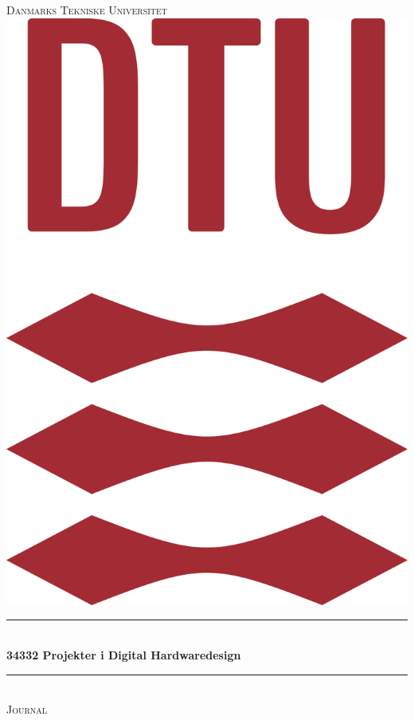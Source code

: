 \begin{titlepage}

\newcommand{\HRule}{\rule{\linewidth}{0.5mm}}

\center

\textsc{\Large Danmarks Tekniske Universitet}\\[1.5cm]

\includegraphics[scale=0.15]{Billeder/DTULogo.png}\\[0.4cm]

\HRule\\[0.5cm]

{\huge\bfseries 34332 Projekter i Digital Hardwaredesign}\\[0.4cm]

\HRule\\[0.5cm]

\textsc{\Large Journal}\\[1cm]



\end{titlepage}
